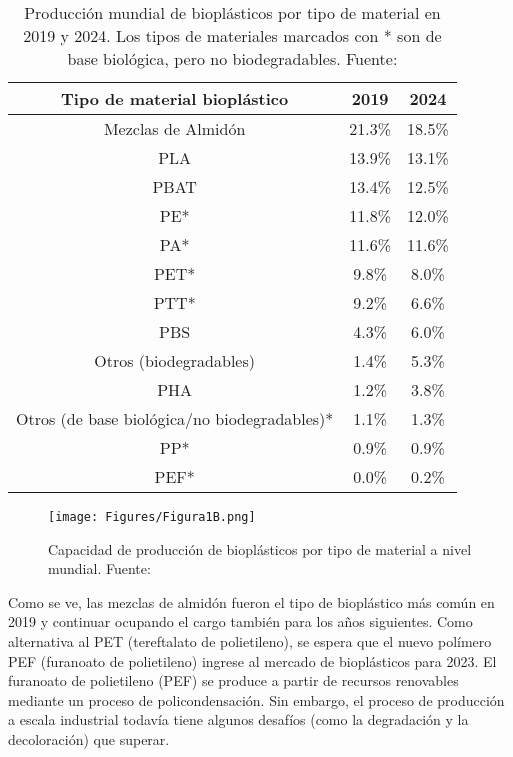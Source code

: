 \documentclass[14pt,oneside]{extarticle} %
\begin{document}
\begin{table}[H]
\begin{center}
{
\setlength\arrayrulewidth{1pt}
\begin{tabular}{|c|c|c|}
\hline
\rowcolor{green!50} \textbf{Tipo de material bioplástico} & \textbf{2019} & \textbf{2024} \\
\hline
\hline
Mezclas de Almidón & 21.3\% & 18.5\%  \\
\hline
PLA & 13.9\% & 13.1\%  \\
\hline
PBAT & 13.4\% & 12.5\%  \\
\hline
PE* & 11.8\% & 12.0\%  \\
\hline
PA* & 11.6\% & 11.6\%  \\
\hline
PET* & 9.8\% & 8.0\%  \\
\hline
PTT* & 9.2\% & 6.6\%  \\
\hline
PBS & 4.3\% & 6.0\%  \\
\hline
Otros (biodegradables) & 1.4\% & 5.3\%  \\
\hline
PHA & 1.2\% & 3.8\%  \\
\hline
Otros (de base biológica/no biodegradables)* & 1.1\% & 1.3\%  \\
\hline
PP* & 0.9\% & 0.9\%  \\
\hline
PEF* & 0.0\% & 0.2\%  \\
\hline
\end{tabular}
}
\end{center}
\caption{Producción mundial de bioplásticos por tipo de material en 2019 y 2024. Los tipos de materiales marcados con * son de base biológica, pero no biodegradables. Fuente: \cite{joogi2020}}
\label{Tab:Ejemplo}
\end{table}

\begin{figure}[H]
    \centering
    \texttt{[image: Figures/Figura1B.png]}
    \caption{ Capacidad de producción de bioplásticos por tipo de material a nivel mundial. Fuente: \cite{joogi2020}}
    \label{fig:Producción}
\end{figure}

Como se ve, las mezclas de almidón fueron el tipo de bioplástico más común en 2019 y continuar ocupando el cargo también para los años siguientes. Como alternativa al PET (tereftalato de polietileno), se espera que el nuevo  polímero PEF (furanoato de polietileno) ingrese al mercado de bioplásticos para  2023. El furanoato de polietileno (PEF) se produce a partir de recursos renovables mediante un proceso de policondensación. Sin embargo, el proceso de producción a escala industrial  todavía tiene algunos desafíos (como la degradación y la decoloración) que superar. 
\end{document}
